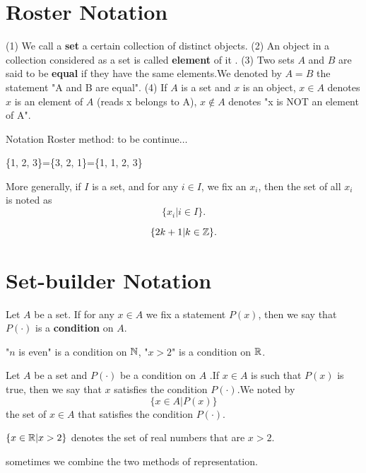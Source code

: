 \documentclass{book}
\numberwithin{equation}{section}
\begin{document}
\section{Roster Notation}
\begin{definitionenv}
    \quad
    \newline
    (1) We call a \textbf{set} a certain collection of distinct objects.
    \newline
    (2) An object in a collection considered as a set is called \textbf{element} of it .
    \newline
    (3) Two sets $A$ and $B$ are said to be \textbf{equal} if they have the same elements.We denoted by $A=B$ the statement "A and B are equal".
    \newline
    (4) If $A$ is a set and $x$ is an object,  $x \in A$ denotes $x$ is an element of $A$ (reads x belongs to A),  $x \notin A$ denotes "x is NOT an element of A".
\end{definitionenv}
Notation Roster method: to be continue$\dots$
\begin{exampleenv}
    \{1, 2, 3\}=\{3, 2, 1\}=\{1, 1, 2, 3\}
\end{exampleenv}
More generally,  if $I$ is a set,  and for any $i \in I$,  we fix an $x_i$,  then the set of all $x_i$ is noted as $$\{x_i|i\in I\}.$$
\begin{exampleenv}
    $$\{2k+1|k\in \mathbb{Z}\}.$$
\end{exampleenv}
\section{Set-builder Notation}
\begin{definitionenv}
    Let $A$ be a set. If for any $x\in A $ we fix a statement $P(x)$,  then we say that $P(\cdot)$ is a \textbf{condition} on $A$. 
\end{definitionenv}
\begin{exampleenv}
    "$n$ is even" is a condition on $\mathbb{N}$,  "$x>2$" is a condition on $\mathbb{R}$.
\end{exampleenv}
\begin{definitionenv}
    Let $A$ be a set and $P(\cdot)$ be a condition on $A$ .If $x\in A$ is such that $P(x)$ is true,  then we say that $x$ satisfies the condition $P(\cdot)$.We noted by $$\{x \in A|P(x)\}$$the set of $x\in A$ that satisfies the condition $P(\cdot)$.
\end{definitionenv}
\begin{exampleenv}
    $\{x\in \mathbb{R}|x>2\}$ denotes the set of real numbers that are $x>2$.
\end{exampleenv}
\begin{center}
    sometimes we combine the two methods of representation.
\end{center}
\end{document}
